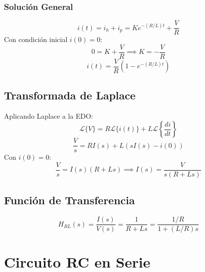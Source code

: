 \documentclass[12pt]{article}
\begin{document}
\subsubsection{Solución General}
\[
i(t) = i_h + i_p = Ke^{-(R/L)t} + \frac{V}{R}
\]
Con condición inicial $i(0) = 0$:
\[
0 = K + \frac{V}{R} \implies K = -\frac{V}{R}
\]
\[
\boxed{i(t) = \frac{V}{R}\left(1 - e^{-(R/L)t}\right)}
\]

\subsection{Transformada de Laplace}
Aplicando Laplace a la EDO:
\[
\mathcal{L}\{V\} = R\mathcal{L}\{i(t)\} + L\mathcal{L}\left\{\frac{di}{dt}\right\}
\]
\[
\frac{V}{s} = RI(s) + L(sI(s) - i(0))
\]
Con $i(0) = 0$:
\[
\frac{V}{s} = I(s)(R + Ls) \implies \boxed{I(s) = \frac{V}{s(R + Ls)}}
\]

\subsection{Función de Transferencia}
\[
H_{RL}(s) = \frac{I(s)}{V(s)} = \frac{1}{R + Ls} = \boxed{\frac{1/R}{1 + (L/R)s}}
\]

\section{Circuito RC en Serie}
\end{document}
